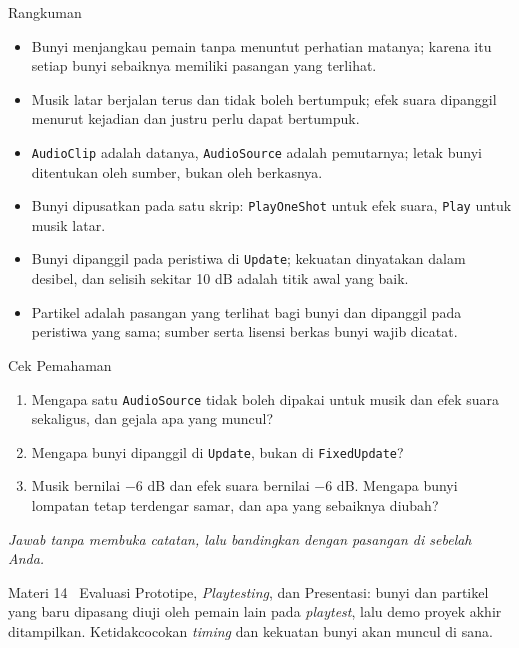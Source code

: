 \documentclass[aspectratio=169,10pt]{beamer}
\begin{document}
\begin{frame}{Rangkuman}
\begin{itemize}
  \item Bunyi menjangkau pemain tanpa menuntut perhatian matanya; karena itu
        setiap bunyi sebaiknya memiliki pasangan yang terlihat.
  \item Musik latar berjalan terus dan tidak boleh bertumpuk; efek suara
        dipanggil menurut kejadian dan justru perlu dapat bertumpuk.
  \item \texttt{AudioClip} adalah datanya, \texttt{AudioSource} adalah
        pemutarnya; letak bunyi ditentukan oleh sumber, bukan oleh berkasnya.
  \item Bunyi dipusatkan pada satu skrip: \texttt{PlayOneShot} untuk efek suara,
        \texttt{Play} untuk musik latar.
  \item Bunyi dipanggil pada peristiwa di \texttt{Update}; kekuatan dinyatakan
        dalam desibel, dan selisih sekitar 10 dB adalah titik awal yang baik.
  \item Partikel adalah pasangan yang terlihat bagi bunyi dan dipanggil pada
        peristiwa yang sama; sumber serta lisensi berkas bunyi wajib dicatat.
\end{itemize}
\end{frame}

\begin{frame}{Cek Pemahaman}
\begin{enumerate}
  \item Mengapa satu \texttt{AudioSource} tidak boleh dipakai untuk musik dan
        efek suara sekaligus, dan gejala apa yang muncul?
  \item Mengapa bunyi dipanggil di \texttt{Update}, bukan di
        \texttt{FixedUpdate}?
  \item Musik bernilai $-6$ dB dan efek suara bernilai $-6$ dB. Mengapa bunyi
        lompatan tetap terdengar samar, dan apa yang sebaiknya diubah?
\end{enumerate}
\vspace{0.35cm}
{\footnotesize\color{ubMuted}\itshape Jawab tanpa membuka catatan, lalu
bandingkan dengan pasangan di sebelah Anda.}
\end{frame}

  {Materi 14 \textperiodcentered\ Evaluasi Prototipe, \emph{Playtesting}, dan
   Presentasi: bunyi dan partikel yang baru dipasang diuji oleh pemain lain
   pada \emph{playtest}, lalu demo proyek akhir ditampilkan. Ketidakcocokan
   \emph{timing} dan kekuatan bunyi akan muncul di sana.}
\end{document}
